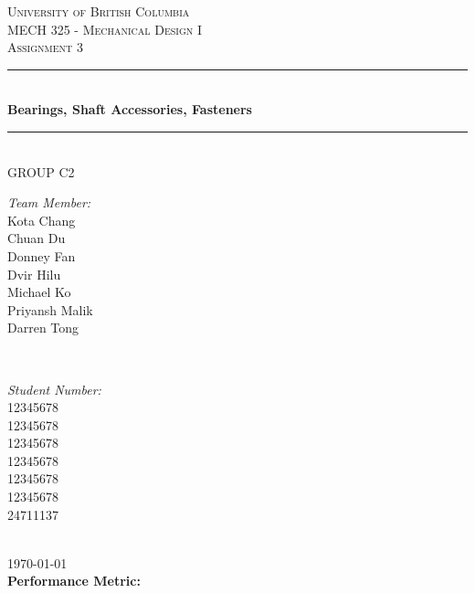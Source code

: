 \documentclass[letterpaper,12pt]{article}
\begin{document}
	
\begin{titlepage}
	
	\newcommand{\HRule}{\rule{\linewidth}{0.5mm}}
	
	\center
	
	\textsc{\LARGE University of British Columbia}\\[1.5cm]
	\textsc{\Large MECH 325 - Mechanical Design I}\\[0.5cm]
	\textsc{\Large Assignment 3}\\[0.5cm]
	
	\HRule \\[0.8cm]
	{ \huge \bfseries Bearings, Shaft Accessories, Fasteners}\\[0.4cm]
	\HRule \\[1cm]
	
	{\Large GROUP C2}\\
	\vspace{0.5cm}
	
	\begin{minipage}{0.4\textwidth}
		\begin{flushleft} \large
			\emph{Team Member:}\\
			Kota Chang\\
			Chuan Du\\
			Donney Fan\\
			Dvir Hilu\\
			Michael Ko\\
			Priyansh Malik\\
			Darren Tong\\
		\end{flushleft}
	\end{minipage}
	~
	\begin{minipage}{0.4\textwidth}
		\begin{flushright} \large
			\emph{Student Number:} \\
			12345678\\
			12345678\\
			12345678\\
			12345678\\
			12345678\\
			12345678\\
			24711137
			
		\end{flushright}
	\end{minipage}\\[2cm]
	
	{\large \today}\\[2cm]
	
	{\Large\textbf{
		Performance Metric:
	}}
	
	
	\vfill %
	
\end{titlepage}
\end{document}
